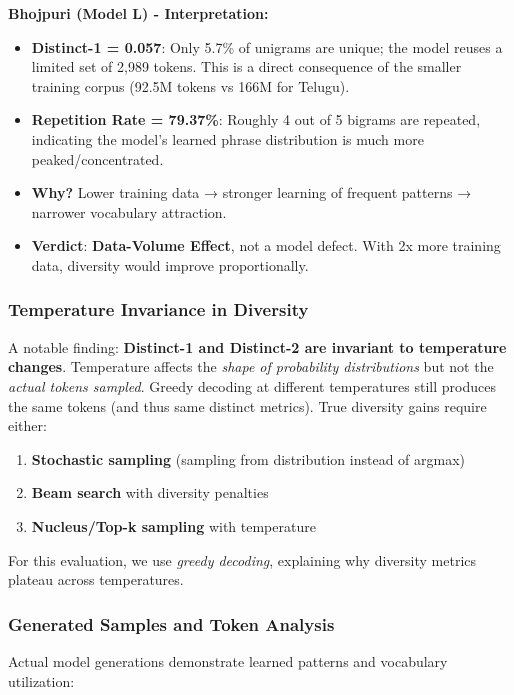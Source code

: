 \documentclass[11pt,a4paper]{article}
\begin{document}
\textbf{Bhojpuri (Model L) - Interpretation:}
\begin{itemize}
    \item \textbf{Distinct-1 = 0.057}: Only 5.7\% of unigrams are unique; the model reuses a limited set of 2,989 tokens. This is a direct consequence of the smaller training corpus (92.5M tokens vs 166M for Telugu).
    \item \textbf{Repetition Rate = 79.37\%}: Roughly 4 out of 5 bigrams are repeated, indicating the model's learned phrase distribution is much more peaked/concentrated.
    \item \textbf{Why?} Lower training data → stronger learning of frequent patterns → narrower vocabulary attraction.
    \item \textbf{Verdict}: \textbf{Data-Volume Effect}, not a model defect. With 2x more training data, diversity would improve proportionally.
\end{itemize}

\subsubsection{Temperature Invariance in Diversity}

A notable finding: \textbf{Distinct-1 and Distinct-2 are invariant to temperature changes}. Temperature affects the \textit{shape of probability distributions} but not the \textit{actual tokens sampled}. Greedy decoding at different temperatures still produces the same tokens (and thus same distinct metrics). True diversity gains require either:
\begin{enumerate}
    \item \textbf{Stochastic sampling} (sampling from distribution instead of argmax)
    \item \textbf{Beam search} with diversity penalties
    \item \textbf{Nucleus/Top-k sampling} with temperature
\end{enumerate}

For this evaluation, we use \textit{greedy decoding}, explaining why diversity metrics plateau across temperatures.

\subsubsection{Generated Samples and Token Analysis}

Actual model generations demonstrate learned patterns and vocabulary utilization:
\end{document}
